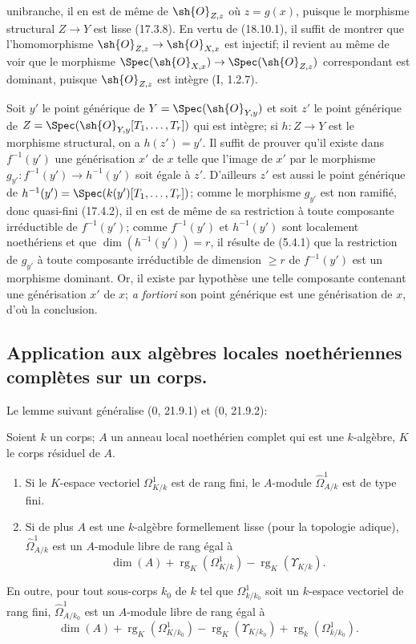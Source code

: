 unibranche, il en est de même de $\sh{O}_{Z,z}$ où $z=g(x)$, puisque le morphisme structural $Z\to Y$ est lisse (17.3.8). En vertu de (18.10.1), il suffit de montrer que l'homomorphisme $\sh{O}_{Z,z}\to\sh{O}_{X,x}$ est injectif; il revient au même de voir que le morphisme $\Spec(\sh{O}_{X,x})\to\Spec(\sh{O}_{Z,z})$ correspondant est dominant, puisque $\sh{O}_{Z,z}$ est intègre (I, 1.2.7).

Soit $y'$ le point générique de $Y=\Spec(\sh{O}_{Y,y})$ et soit $z'$ le point générique de $Z=\Spec(\sh{O}_{Y,y}[T_1,\ldots,T_r])$ qui est intègre; si $h:Z\to Y$ est le morphisme structural, on a $h(z')=y'$. Il suffit de prouver qu'il existe dans $f^{-1}(y')$ une générisation $x'$ de $x$ telle que l'image de $x'$ par le morphisme $g_{y'}:f^{-1}(y')\to h^{-1}(y')$ soit égale à $z'$. D'ailleurs $z'$ est aussi le point générique de $h^{-1}(y')=\Spec(k(y')[T_1,\ldots,T_r])$; comme le morphisme $g_{y'}$ est non ramifié, donc quasi-fini (17.4.2), il en est de même de sa restriction à toute composante irréductible de $f^{-1}(y')$; comme $f^{-1}(y')$ et $h^{-1}(y')$ sont localement noethériens et que $\dim(h^{-1}(y'))=r$, il résulte de (5.4.1) que la restriction de $g_{y'}$ à toute composante irréductible de dimension $\geq r$ de $f^{-1}(y')$ est un morphisme dominant. Or, il existe par hypothèse une telle composante contenant une générisation $x'$ de $x$; \emph{a fortiori} son point générique est une générisation de $x$, d'où la conclusion.

\subsection{Application aux algèbres locales noethériennes complètes sur un corps.}
\label{subsection:IV.18.11}

Le lemme suivant généralise (0, 21.9.1) et (0, 21.9.2):

\begin{lemma}[18.11.1]
\label{IV.18.11.1}
Soient $k$ un corps; $A$ un anneau local noethérien complet qui est une $k$-algèbre, $K$ le corps résiduel de $A$.
\begin{enumerate}
  \item[(i)] Si le $K$-espace vectoriel $\Omega^1_{K/k}$ est de rang fini, le $A$-module $\hat{\Omega}^1_{A/k}$ est de type fini.
  \item[(ii)] Si de plus $A$ est une $k$-algèbre formellement lisse (pour la topologie adique), $\hat{\Omega}^1_{A/k}$ est un $A$-module libre de rang égal à
\[
    \dim(A)+\operatorname{rg}_K(\Omega^1_{K/k})-\operatorname{rg}_K(\Upsilon_{K/k}).
\]
\end{enumerate}
En outre, pour tout sous-corps $k_0$ de $k$ tel que $\Omega^1_{k/k_0}$ soit un $k$-espace vectoriel de rang fini, $\hat{\Omega}^1_{A/k_0}$ est un $A$-module libre de rang égal à
\[
  \dim(A)+\operatorname{rg}_K(\Omega^1_{K/k_0})-\operatorname{rg}_K(\Upsilon_{K/k_0})+\operatorname{rg}_k(\Omega^1_{k/k_0}).
\]
\end{lemma}

